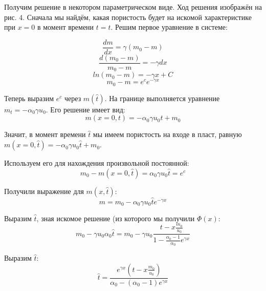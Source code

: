 \par Получим решение в некотором параметрическом виде. Ход решения изображён на рис. 4. Сначала мы найдём, какая пористость будет на искомой характеристике при $x=0$ в момент времени $t = \hat{t}$. Решим первое уравнение в системе:

$$\frac{dm}{dx}=\gamma(m_{0}-m)$$
$$\frac{d(m_{0}-m)}{m_{0}-m}=-\gamma dx$$
$$ln(m_{0}-m)=-\gamma x + C$$
$$m_{0}-m = e^{c}e^{-\gamma x}$$
\par Теперь выразим $e^{c}$ через $m(\hat{t})$. На границе выполняется уравнение $m_{t}=-\alpha_{0}\gamma u_{0}$. Его решение имеет вид: 
$$m(x=0,t)=-\alpha_{0}\gamma u_{0}t+m_{0}$$
\par Значит, в момент времени $\hat{t}$ мы имеем пористость на входе в пласт, равную $m(x=0,\hat{t})=-\alpha_{0}\gamma u_{0}\hat{t}+m_{0}$. 
\par Используем его для нахождения произвольной постоянной:
$$m_{0}-m(x=0,\hat{t})= \alpha_{0}\gamma u_{0}\hat{t} = e^{c}$$
\par Получили выражение для $m(x,\hat{t})$:
$$m =m_{0} -\alpha_{0}\gamma u_{0}\hat{t}e^{-\gamma x}$$
\par Выразим $\hat{t}$, зная искомое решение (из которого мы получили $\Phi(x)$:
$$m_{0}-\gamma u_{0} \alpha_{0}\hat{t}=m_{0}-\gamma u_{0}\frac{t-x\frac{m_{0}}{u_{0}}}{1-\frac{\alpha_{0}-1}{\alpha_{0}}e^{\gamma x}}$$
\par Выразим $\hat{t}$:
$$\hat{t}=\frac{e^{\gamma x}(t-x\frac{m_{0}}{u_{0}})}{\alpha_{0}-(\alpha_{0}-1)e^{\gamma x}}$$